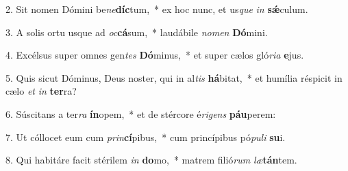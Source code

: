 2. Sit nomen Dómini be\textit{ne}\textbf{díc}tum,~*  ex hoc nunc, et us\textit{que} \textit{in} \textbf{sǽ}culum.\

3. A solis ortu usque ad \textit{oc}\textbf{cá}sum,~*  laudábile \textit{no}\textit{men} \textbf{Dó}mini.\

4. Excélsus super omnes gen\textit{tes} \textbf{Dó}minus,~*  et super cælos gló\textit{ri}\textit{a} \textbf{e}jus.\

5. Quis sicut Dóminus, Deus noster, qui in al\textit{tis} \textbf{há}bitat,~*  et humília réspicit in cælo \textit{et} \textit{in} \textbf{ter}ra?\

6. Súscitans a ter\textit{ra} \textbf{ín}opem,~*  et de stércore é\textit{ri}\textit{gens} \textbf{páu}perem:\

7. Ut cóllocet eum cum \textit{prin}\textbf{cí}pibus,~*  cum princípibus pó\textit{pu}\textit{li} \textbf{su}i.\

8. Qui habitáre facit stérilem \textit{in} \textbf{do}mo,~*  matrem filió\textit{rum} \textit{læ}\textbf{tán}tem.\

